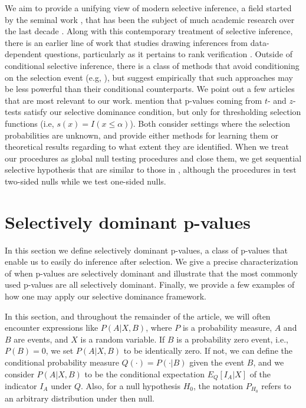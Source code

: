 \documentclass{article}
\begin{document}
We aim to provide a unifying view of modern selective inference, a field started by the seminal work \cite{Lee2016}, that has been the subject of much academic research over the last decade \citep{Panigrahi, Benjamini, Tian2018Apr, Tian2018Dec,Taylor2014, Taylor2016, Taylor2018, Tibshirani, Fithian2015, Loftus, Chen2023Apr, Chen2023May, Gao, Lee2014, Hyun}. Along with this contemporary treatment of selective inference, there is an earlier line of work that studies drawing inferences from data-dependent questions, particularly as it pertains to rank verification \cite{Bofinger, Fabian, Gutmann, Maymin, Hsu}. Outside of conditional selective inference, there is a class of methods that avoid conditioning on the selection event (e.g, \citep{Romano, Zrnic}), but \cite{Perry} suggest empirically that such approaches may be less powerful than their conditional counterparts. We point out a few articles that are most relevant to our work. \cite{Hung2020} mention that p-values coming from $t$- and $z$-tests satisfy our selective dominance condition, but only for thresholding selection functions (i.e, $s(x) = I(x \leq \alpha)$). Both \cite{Markovic, Andrews2019} consider settings where the selection probabilities are unknown, and provide either methods for learning them or theoretical results regarding to what extent they are identified. When we treat our procedures as global null testing procedures and close them, we get sequential selective hypothesis that are similar to those in \cite{Fithian2015}, although the procedures in \cite{Fithian2015} test two-sided nulls while we test one-sided nulls. 


\section{Selectively dominant p-values}
\label{sec:dominance}

In this section we define selectively dominant p-values, a class of p-values that enable us to easily do inference after selection. We give a precise characterization of when p-values are selectively dominant and illustrate that the most commonly used p-values are all selectively dominant. Finally, we provide a few examples of how one may apply our selective dominance framework. 

In this section, and throughout the remainder of the article, we will often encounter expressions like $P(A|X, B)$, where $P$ is a probability measure, $A$ and $B$ are events, and $X$ is a random variable. If $B$ is a probability zero event, i.e., $P(B) = 0$, we set $P(A|X, B)$ to be identically zero. If not, we can define the conditional probability measure $Q(\cdot) = P(\cdot| B)$ given the event $B$, and we consider $P(A | X, B)$ to be the conditional expectation $E_Q[I_A| X]$ of the indicator $I_A$ under $Q$. Also, for a null hypothesis $H_0$, the notation $P_{H_0}$ refers to an arbitrary distribution under then null. %
\end{document}
